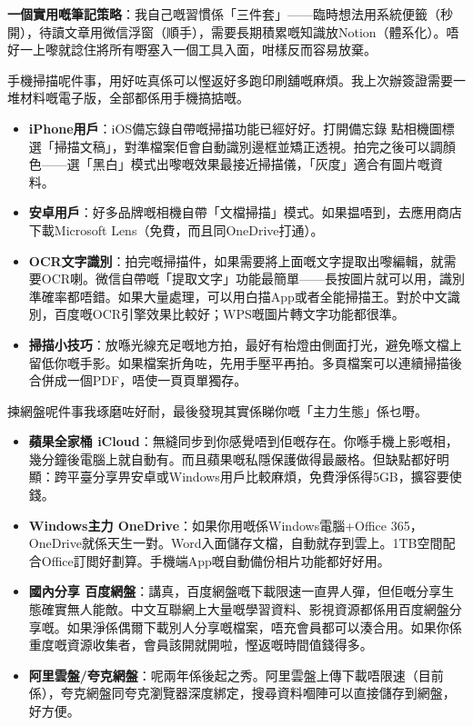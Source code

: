 \textbf{一個實用嘅筆記策略}：我自己嘅習慣係「三件套」——臨時想法用系統便籤（秒開），待讀文章用微信浮窗（順手），需要長期積累嘅知識放Notion（體系化）。唔好一上嚟就諗住將所有嘢塞入一個工具入面，咁樣反而容易放棄。


手機掃描呢件事，用好咗真係可以慳返好多跑印刷舖嘅麻煩。我上次辦簽證需要一堆材料嘅電子版，全部都係用手機搞掂嘅。

\begin{itemize}
  \item \textbf{iPhone用戶}：iOS備忘錄自帶嘅掃描功能已經好好。打開備忘錄 點相機圖標 選「掃描文稿」，對準檔案佢會自動識別邊框並矯正透視。拍完之後可以調顏色——選「黑白」模式出嚟嘅效果最接近掃描儀，「灰度」適合有圖片嘅資料。
  \item \textbf{安卓用戶}：好多品牌嘅相機自帶「文檔掃描」模式。如果揾唔到，去應用商店下載Microsoft Lens（免費，而且同OneDrive打通）。
  \item \textbf{OCR文字識別}：拍完嘅掃描件，如果需要將上面嘅文字提取出嚟編輯，就需要OCR喇。微信自帶嘅「提取文字」功能最簡單——長按圖片就可以用，識別準確率都唔錯。如果大量處理，可以用白描App或者全能掃描王。對於中文識別，百度嘅OCR引擎效果比較好；WPS嘅圖片轉文字功能都很準。
  \item \textbf{掃描小技巧}：放喺光線充足嘅地方拍，最好有枱燈由側面打光，避免喺文檔上留低你嘅手影。如果檔案折角咗，先用手壓平再拍。多頁檔案可以連續掃描後合併成一個PDF，唔使一頁頁單獨存。
\end{itemize}


揀網盤呢件事我琢磨咗好耐，最後發現其實係睇你嘅「主力生態」係乜嘢。

\begin{itemize}
  \item \textbf{蘋果全家桶 iCloud}：無縫同步到你感覺唔到佢嘅存在。你喺手機上影嘅相，幾分鐘後電腦上就自動有。而且蘋果嘅私隱保護做得最嚴格。但缺點都好明顯：跨平臺分享畀安卓或Windows用戶比較麻煩，免費淨係得5GB，擴容要使錢。
  \item \textbf{Windows主力 OneDrive}：如果你用嘅係Windows電腦+Office 365，OneDrive就係天生一對。Word入面儲存文檔，自動就存到雲上。1TB空間配合Office訂閲好劃算。手機端App嘅自動備份相片功能都好好用。
  \item \textbf{國內分享 百度網盤}：講真，百度網盤嘅下載限速一直畀人彈，但佢嘅分享生態確實無人能敵。中文互聯網上大量嘅學習資料、影視資源都係用百度網盤分享嘅。如果淨係偶爾下載別人分享嘅檔案，唔充會員都可以湊合用。如果你係重度嘅資源收集者，會員該開就開啦，慳返嘅時間值錢得多。
  \item \textbf{阿里雲盤/夸克網盤}：呢兩年係後起之秀。阿里雲盤上傳下載唔限速（目前係），夸克網盤同夸克瀏覽器深度綁定，搜尋資料嗰陣可以直接儲存到網盤，好方便。
\end{itemize}

